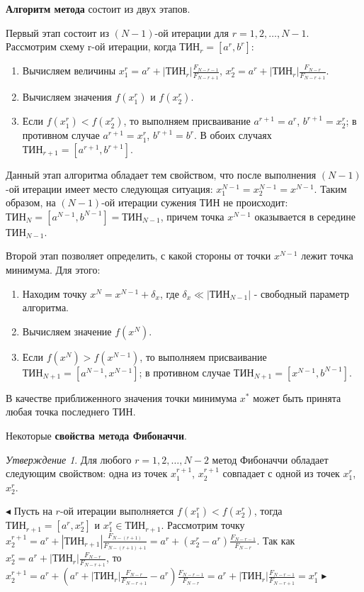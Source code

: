 \documentclass[a4paper,12pt]{report}
\begin{document}
\textbf{Алгоритм метода} состоит из двух этапов.

Первый этап состоит из $\left(N-1\right)$-ой итерации для $r = 1, 2, \ldots, N-1$. Рассмотрим схему r-ой итерации, когда $\text{ТИН}_{r} = \left[a^{r}, b^{r}\right]$:
\begin{enumerate}
\item Вычисляем величины $x^{r}_{1} = a^{r} + \left|\text{ТИН}_{r}\right|\frac{F_{N-r-1}}{F_{N-r+1}}$, $x^{r}_{2} = a^{r} + \left|\text{ТИН}_{r}\right|\frac{F_{N-r}}{F_{N-r+1}}$.
\item Вычисляем значения $f(x^{r}_{1})$ и $f(x^{r}_{2})$.
\item Если $f(x^{r}_{1}) < f(x^{r}_{2})$, то выполняем присваивание $a^{r+1} = a^{r}$, $b^{r+1} = x^{r}_{2}$; в противном случае $a^{r+1} = x^{r}_{1}$, $b^{r+1} = b^{r}$. В обоих случаях $\text{ТИН}_{r+1} = \left[a^{r+1}, b^{r+1}\right]$.
\end{enumerate}

Данный этап алгоритма обладает тем свойством, что после выполнения $\left(N-1\right)$-ой итерации имеет место следующая ситуация: $x^{N-1}_{1} = x^{N-1}_{2} = x^{N-1}$. Таким образом, на $\left(N-1\right)$-ой итерации сужения ТИН не происходит: $\text{ТИН}_{N} = \left[a^{N-1}, b^{N-1}\right] = \text{ТИН}_{N-1}$, причем точка $x^{N-1}$ оказывается в середине $\text{ТИН}_{N-1}$.

Второй этап позволяет определить, с какой стороны от точки $x^{N-1}$ лежит точка минимума. Для этого:
\begin{enumerate}
\item Находим точку $x^{N} = x^{N-1} + \delta_{x}$, где $\delta_{x} \ll \left|\text{ТИН}_{N-1}\right|$ - свободный параметр алгоритма.
\item Вычисляем значение $f(x^{N})$.
\item Если $f(x^{N}) > f(x^{N-1})$, то выполняем присваивание $\text{ТИН}_{N+1} = \left[a^{N-1}, x^{N-1}\right]$; в противном случае $\text{ТИН}_{N+1} = \left[x^{N-1}, b^{N-1}\right]$.
\end{enumerate}
В качестве приближенного значения точки минимума $x^{*}$ может быть принята любая точка последнего ТИН.

Некоторые \textbf{свойства метода Фибоначчи}.

\textit{Утверждение 1}. Для любого $r = 1, 2, \ldots, N-2$ метод Фибоначчи обладает следующим свойством: одна из точек $x^{r+1}_{1}$, $x^{r+1}_{2}$ совпадает с одной из точек $x^{r}_{1}$, $x^{r}_{2}$.

$\blacktriangleleft$ Пусть на $r$-ой итерации выполняется $f(x^{r}_{1}) < f(x^{r}_{2})$, тогда $\text{ТИН}_{r+1} = \left[a^{r}, x^{r}_{2}\right]$ и $x^{r}_{1} \in \text{ТИН}_{r+1}$. Рассмотрим точку $x^{r+1}_{2} = a^{r} + \left|\text{ТИН}_{r+1}\right|\frac{F_{N-(r+1)}}{F_{N-(r+1)+1}} = a^{r} + \left(x^{r}_{2} - a^{r}\right)\frac{F_{N-r-1}}{F_{N-r}}$. Так как $x^{r}_{2} = a^{r} + \left|\text{ТИН}_{r}\right|\frac{F_{N-r}}{F_{N-r+1}}$, то $x^{r+1}_{2} = a^{r} + \left(a^{r} + \left|\text{ТИН}_{r}\right|\frac{F_{N-r}}{F_{N-r+1}} - a^{r}\right)\frac{F_{N-r-1}}{F_{N-r}} = a^{r} + \left|\text{ТИН}_{r}\right|\frac{F_{N-r-1}}{F_{N-r+1}} = x^{r}_{1}$ $\blacktriangleright$
\end{document}
